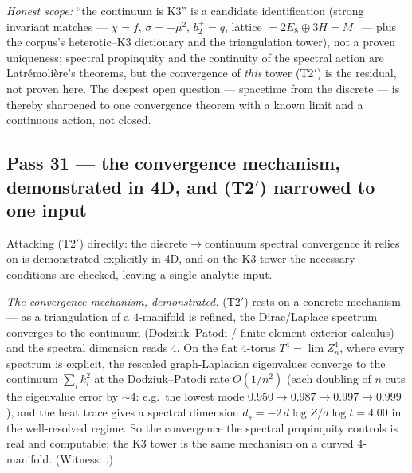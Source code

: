 \documentclass[11pt]{article}
\begin{document}
\emph{Honest scope:} ``the continuum is K3'' is a candidate identification (strong invariant
matches --- $\chi=f$, $\sigma=-\mu^2$, $b_2^+=q$, lattice $=2E_8\oplus3H=M_1$ --- plus the corpus's
heterotic--K3 dictionary and the triangulation tower), not a proven uniqueness; spectral propinquity
and the continuity of the spectral action are Latr\'emoli\`ere's theorems, but the convergence of
\emph{this} tower (T2$'$) is the residual, not proven here. The deepest open question --- spacetime
from the discrete --- is thereby sharpened to one convergence theorem with a known limit and a
continuous action, not closed.

\subsection{Pass 31 --- the convergence mechanism, demonstrated in 4D, and (T2$'$) narrowed to one input}
\label{sec:capstone-thirtyone}

Attacking (T2$'$) directly: the discrete$\to$continuum spectral convergence it relies on is
demonstrated explicitly in 4D, and on the K3 tower the necessary conditions are checked, leaving a
single analytic input.

\emph{The convergence mechanism, demonstrated.} (T2$'$) rests on a concrete mechanism --- as a
triangulation of a $4$-manifold is refined, the Dirac/Laplace spectrum converges to the continuum
(Dodziuk--Patodi / finite-element exterior calculus) and the spectral dimension reads $4$. On the
flat $4$-torus $T^4=\lim Z_n^4$, where every spectrum is explicit, the rescaled graph-Laplacian
eigenvalues converge to the continuum $\sum_i k_i^2$ at the Dodziuk--Patodi rate $O(1/n^2)$ (each
doubling of $n$ cuts the eigenvalue error by $\sim4$: e.g.\ the lowest mode $0.950\to0.987\to0.997
\to0.999$), and the heat trace gives a spectral dimension $d_s=-2\,d\log Z/d\log t=4.00$ in the
well-resolved regime. So the convergence the spectral propinquity controls is real and computable;
the K3 tower is the same mechanism on a curved $4$-manifold. (Witness:
.)
\end{document}
